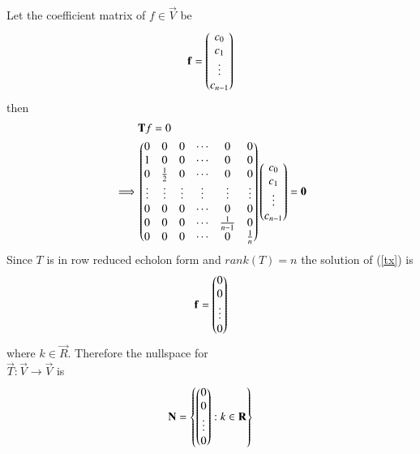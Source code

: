 \documentclass[journal,12pt,twocolumn]{IEEEtran}
\begin{document}
\begin{enumerate}[label=\emph{\alph*)}]
                Let the coefficient matrix of $f \in \vec{V}$ be
                \begin{align}
                        \mathbf{f}=\begin{pmatrix}c_0\\c_1\\\vdots\\c_{n-1}\end{pmatrix}
                \end{align}
                then
\begin{align}
	&\vec{T}f=0 \\
	\implies 
	&\myvec{0 & 0 & 0 & \cdots & 0 & 0\\
               1 & 0 & 0 & \cdots & 0 & 0\\
               0 & \frac{1}{2} & 0 & \cdots & 0 & 0\\
               \vdots & \vdots & \vdots & \vdots & \vdots & \vdots\\
               0 & 0 & 0 & \cdots & 0 & 0 \\
               0 & 0 & 0 & \cdots & \frac{1}{n-1} & 0 \\
               0 & 0 & 0 & \cdots & 0 & \frac{1}{n} }
	       \myvec{c_0\\c_1\\\vdots\\c_{n-1}}=\vec{0} \label{tx}
\end{align}
Since $T$ is in row reduced echolon form and $rank(T)=n$ the solution of (\ref{tx}) is
\begin{align}
\mathbf{f}=\begin{pmatrix}0\\0\\\vdots\\0\end{pmatrix}
\end{align}
where $k \in \vec{R}$. Therefore the nullspace for \\$\vec{T}:\vec{V}\rightarrow\vec{V}$ is
\begin{align}
        \mathbf{N}=\left\{\begin{pmatrix}0\\0\\\vdots\\0\end{pmatrix}:k \in \mathbf{R}\right\}
\end{align}
\end{enumerate}
\end{document}
